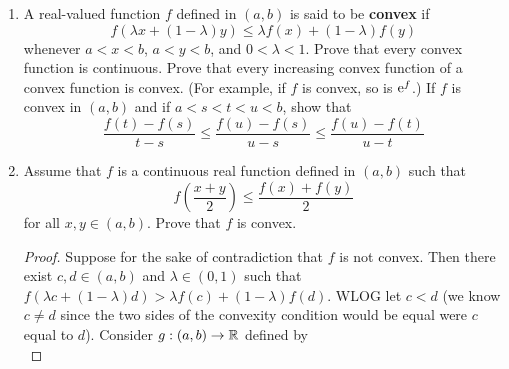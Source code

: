 \documentclass[../psets.tex]{subfiles}
\begin{document}
\begin{enumerate}[label={\textbf{\arabic*.}}]
\begin{proof}
        If $p\in B$, then
        \begin{align*}
            f(p) &= \frac{\rho_A(p)}{\rho_A(p)+\rho_B(p)}\\
            &= \frac{\rho_A(p)}{\rho_A(p)+0}\tag*{Exercise 4.20a}\\
            &= 1
        \end{align*}
        as desired. On the other hand, if $f(p)=1$, then $\rho_B(p)=0$, so Exercise 4.20a implies that $p\in B$, as desired.\par\smallskip
        Since $[0,\frac{1}{2})$ is open in $[0,1]$ and $f$ is continuous, Theorem 4.8 asserts that $V=f^{-1}([0,\frac{1}{2}))$ is open in $X$. Similarly, $W$ is open in $X$. Additionally, $V,W$ are disjoint since if $x\in V\cap W$, then $f(x)<1/2$ and $f(x)>1/2$, a contradiction. Lastly, if $p\in A$, the $f(p)=0$, so $p\in V$. Similarly, $B\subset W$.
    \end{proof}
    \item A real-valued function $f$ defined in $(a,b)$ is said to be \textbf{convex} if
    \begin{equation*}
        f(\lambda x+(1-\lambda)y) \leq \lambda f(x)+(1-\lambda)f(y)
    \end{equation*}
    whenever $a<x<b$, $a<y<b$, and $0<\lambda<1$. Prove that every convex function is continuous. Prove that every increasing convex function of a convex function is convex. (For example, if $f$ is convex, so is $\e[f]$.) If $f$ is convex in $(a,b)$ and if $a<s<t<u<b$, show that
    \begin{equation*}
        \frac{f(t)-f(s)}{t-s} \leq \frac{f(u)-f(s)}{u-s} \leq \frac{f(u)-f(t)}{u-t}
    \end{equation*}
    \item Assume that $f$ is a continuous real function defined in $(a,b)$ such that
    \begin{equation*}
        f\left( \frac{x+y}{2} \right) \leq \frac{f(x)+f(y)}{2}
    \end{equation*}
    for all $x,y\in(a,b)$. Prove that $f$ is convex.
    \begin{proof}
        Suppose for the sake of contradiction that $f$ is not convex. Then there exist $c,d\in(a,b)$ and $\lambda\in(0,1)$ such that $f(\lambda c+(1-\lambda)d)>\lambda f(c)+(1-\lambda)f(d)$. WLOG let $c<d$ (we know $c\neq d$ since the two sides of the convexity condition would be equal were $c$ equal to $d$). Consider $g:(a,b)\to\R$ defined by
        \begin{equation*}

\end{equation*}
\end{proof}
\end{enumerate}
\end{document}
